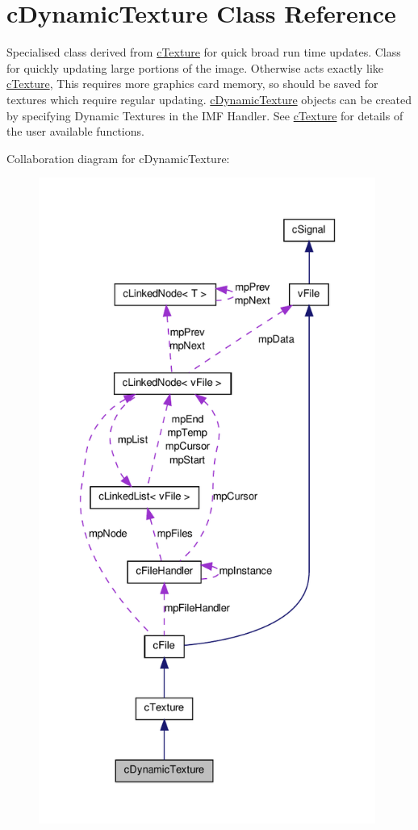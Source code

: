 \hypertarget{classc_dynamic_texture}{
\section{cDynamicTexture Class Reference}
\label{classc_dynamic_texture}
}


Specialised class derived from \hyperlink{classc_texture}{cTexture} for quick broad run time updates. Class for quickly updating large portions of the image. Otherwise acts exactly like \hyperlink{classc_texture}{cTexture}, This requires more graphics card memory, so should be saved for textures which require regular updating. \hyperlink{classc_dynamic_texture}{cDynamicTexture} objects can be created by specifying Dynamic Textures in the IMF Handler. See \hyperlink{classc_texture}{cTexture} for details of the user available functions.  




Collaboration diagram for cDynamicTexture:\nopagebreak
\begin{figure}[H]
\begin{center}
\leavevmode
\includegraphics[height=600pt]{classc_dynamic_texture__coll__graph}
\end{center}
\end{figure}
